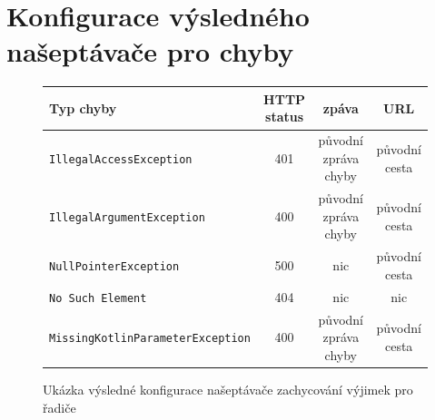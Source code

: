 \chapter{Konfigurace výsledného našeptávače pro chyby}\label{dodatek:excpetion-handler2}
    \begin{figure} \centering
    \begin{adjustbox}{angle=90} \centering
            \begin{tabular}{|l|c|c|c|}\hline
        	  Typ chyby		& HTTP status		& zpáva	& URL 	\tabularnewline \hline \hline
        	  \texttt{IllegalAccessException}	& 401	& původní zpráva chyby		& původní cesta     \tabularnewline \hline
        	  \texttt{IllegalArgumentException}	& 400	& původní zpráva chyby		& původní cesta     \tabularnewline \hline
        	  \texttt{NullPointerException}	& 500	& nic		& původní cesta     \tabularnewline \hline
        	  \texttt{No Such Element}	& 404	& nic		& nic     \tabularnewline \hline
        	  \texttt{MissingKotlinParameterException}	& 400	& původní zpráva chyby		& původní cesta     \tabularnewline \hline
            \end{tabular}
    \end{adjustbox} \caption[Konfigurace výsledného našeptávače pro řadiče]{Ukázka výsledné konfigurace našeptávače zachycování výjimek pro řadiče}
    \end{figure}
